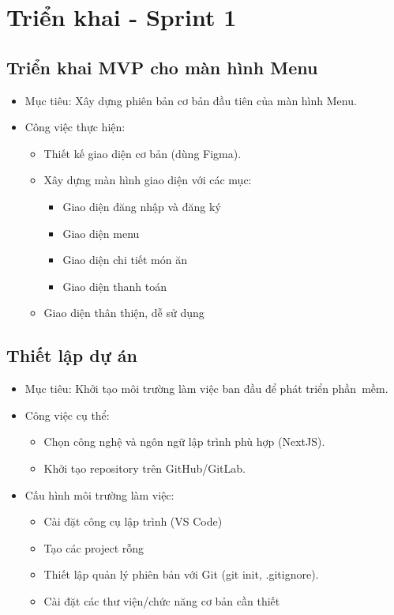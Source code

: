 \documentclass[a4paper]{article}
\begin{document}
\section{Triển khai - Sprint 1}
\subsection{Triển khai MVP cho màn hình Menu}
\begin{itemize}
    \item Mục tiêu: Xây dựng phiên bản cơ bản đầu tiên của màn hình Menu.
    \item Công việc thực hiện:
          \begin{itemize}
              \item Thiết kế giao diện cơ bản (dùng Figma).
              \item Xây dựng màn hình giao diện với các mục:
                    \begin{itemize}
                        \item Giao diện đăng nhập và đăng ký
                        \item Giao diện menu
                        \item Giao diện chi tiết món ăn
                        \item Giao diện thanh toán
                    \end{itemize}
              \item Giao diện thân thiện, dễ sử dụng
          \end{itemize}
\end{itemize}
\subsection{Thiết lập dự án}
\begin{itemize}
    \item Mục tiêu: Khởi tạo môi trường làm việc ban đầu để phát triển phần~mềm.
    \item Công việc cụ thể:
          \begin{itemize}
              \item Chọn công nghệ và ngôn ngữ lập trình phù hợp (NextJS).
              \item Khởi tạo repository trên GitHub/GitLab.
          \end{itemize}
    \item Cấu hình môi trường làm việc:
          \begin{itemize}
              \item Cài đặt công cụ lập trình (VS Code)
              \item Tạo các project rỗng
              \item Thiết lập quản lý phiên bản với Git (git init, .gitignore).
              \item Cài đặt các thư viện/chức năng cơ bản cần thiết
          \end{itemize}
\end{itemize}
\end{document}
